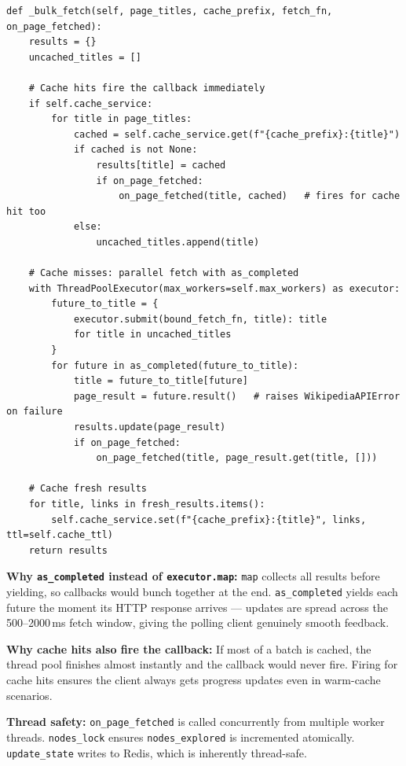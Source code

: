\documentclass[11pt,a4paper]{article}
\begin{document}
\begin{lstlisting}[caption=wikipedia.py -- \_bulk\_fetch firing on\_page\_fetched]
def _bulk_fetch(self, page_titles, cache_prefix, fetch_fn, on_page_fetched):
    results = {}
    uncached_titles = []

    # Cache hits fire the callback immediately
    if self.cache_service:
        for title in page_titles:
            cached = self.cache_service.get(f"{cache_prefix}:{title}")
            if cached is not None:
                results[title] = cached
                if on_page_fetched:
                    on_page_fetched(title, cached)   # fires for cache hit too
            else:
                uncached_titles.append(title)

    # Cache misses: parallel fetch with as_completed
    with ThreadPoolExecutor(max_workers=self.max_workers) as executor:
        future_to_title = {
            executor.submit(bound_fetch_fn, title): title
            for title in uncached_titles
        }
        for future in as_completed(future_to_title):
            title = future_to_title[future]
            page_result = future.result()   # raises WikipediaAPIError on failure
            results.update(page_result)
            if on_page_fetched:
                on_page_fetched(title, page_result.get(title, []))

    # Cache fresh results
    for title, links in fresh_results.items():
        self.cache_service.set(f"{cache_prefix}:{title}", links, ttl=self.cache_ttl)
    return results
\end{lstlisting}

\noindent\textbf{Why \texttt{as\_completed} instead of \texttt{executor.map}:} \texttt{map} collects all results before yielding, so callbacks would bunch together at the end. \texttt{as\_completed} yields each future the moment its HTTP response arrives --- updates are spread across the 500--2000\,ms fetch window, giving the polling client genuinely smooth feedback.

\noindent\textbf{Why cache hits also fire the callback:} If most of a batch is cached, the thread pool finishes almost instantly and the callback would never fire. Firing for cache hits ensures the client always gets progress updates even in warm-cache scenarios.

\noindent\textbf{Thread safety:} \texttt{on\_page\_fetched} is called concurrently from multiple worker threads. \texttt{nodes\_lock} ensures \texttt{nodes\_explored} is incremented atomically. \texttt{update\_state} writes to Redis, which is inherently thread-safe.
\end{document}
